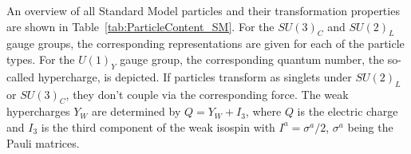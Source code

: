 An overview of all Standard Model particles and their transformation properties are shown in Table~\ref{tab:ParticleContent_SM}.
For the $SU(3)_C$ and $SU(2)_L$ gauge groups, the corresponding representations are given for each of the particle types.
For the $U(1)_Y$ gauge group, the corresponding quantum number, the so-called hypercharge, is depicted.
If particles transform as singlets under $SU(2)_L$ or $SU(3)_C$, they don't couple via the corresponding force.
The weak hypercharges $Y_W$ are determined by $Q=Y_W+I_3$, where $Q$ is the electric charge and $I_3$ is the third component of the weak isospin with $I^a = \sigma^a/2$, $\sigma^a$ being the Pauli matrices. 

\renewcommand{\arraystretch}{1.4}
\begin{table}[!h]
\centering
\caption{All particles contained in the Standard Model and their transformation properties under $SU(3)_C  \times SU(2)_L \times U(1)_Y$. 
         For the gauge groups $SU(3)_C$ and $SU(2)_L$, the representations are listed whereas for $U(1)_Y$ the hypercharge is given.}
\label{tab:ParticleContent_SM}
\end{table}  


